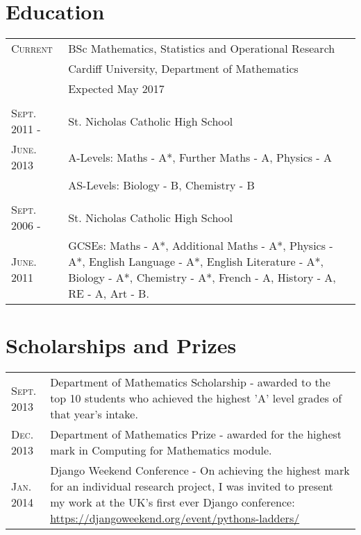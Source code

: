 \documentclass[a4paper]{article}
\begin{document}
\section{Education}
\begin{tabularx}{\textwidth}{lX}

\textsc{Current} & \textsc BSc Mathematics, Statistics and Operational Research \\
&\normalsize Cardiff University, Department of Mathematics\\
& Expected May 2017\\
\\
\textsc{Sept. 2011 -} & St. Nicholas Catholic High School\\
\textsc{June. 2013} & A-Levels: Maths - A*, Further Maths - A, Physics - A\\
& AS-Levels: Biology - B, Chemistry - B\\
\\
\textsc{Sept. 2006 -} & St. Nicholas Catholic High School\\
\textsc{June. 2011} & GCSEs: Maths - A*, Additional Maths - A*, Physics - A*, English Language - A*, English Literature - A*, Biology - A*, Chemistry - A*, French - A, History - A, RE - A, Art - B.\\

\end{tabularx}
\section{Scholarships and Prizes}
\begin{tabularx}{\textwidth}{lX}

\textsc{Sept.} 2013 & Department of Mathematics Scholarship - awarded to the top 10 students who achieved the highest 'A' level grades of that year's intake.\\
\textsc{Dec.} 2013 & Department of Mathematics Prize - awarded for the highest mark in Computing for Mathematics module.\\
\textsc{Jan.} 2014 & Django Weekend Conference - On achieving the highest mark for an individual research project, I was invited to present my work at the UK's first ever Django conference: \url{https://djangoweekend.org/event/pythons-ladders/}\\

\end{tabularx}
\newpage
\end{document}
